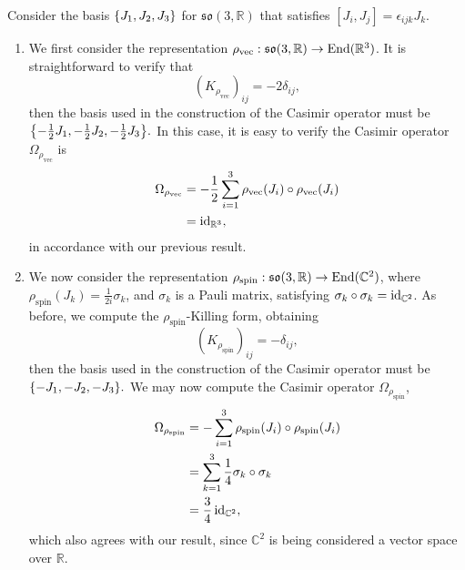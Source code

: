 \begin{example}
    Consider the basis \(\{J_1,J_2,J_3\}\) for \(\mathfrak{so}(3,\mathbb{R})\) that satisfies \([J_i, J_j] = \epsilon_{ijk} J_k.\)
    \begin{enumerate}[label=(\alph*)]
        \item We first consider the representation \(\rho_{\mathrm{vec}} : \mathfrak{so}(3,\mathbb{R}) \to \operatorname{End}(\mathbb{R}^3)\). It is straightforward to verify that
            \begin{equation*}
                \left(K_{\rho_{\mathrm{vec}}}\right)_{ij} = -2\delta_{ij},
            \end{equation*}
            then the basis used in the construction of the Casimir operator must be \(\set*{-\frac{1}{2}J_1, -\frac{1}{2}J_2, -\frac{1}{2}J_3}.\) In this case, it is easy to verify the Casimir operator \(\Omega_{\rho_{\mathrm{vec}}}\) is
            \begin{align*}
                \Omega_{\rho_{\mathrm{vec}}} &= -\frac{1}{2} \sum_{i = 1}^3 \rho_{\mathrm{vec}}(J_i)\circ\rho_{\mathrm{vec}}(J_i)\\
                                             &= \operatorname{id}_{\mathbb{R}^3},
            \end{align*}
            in accordance with our previous result.
        \item We now consider the representation \(\rho_{\mathrm{spin}} : \mathfrak{so}(3,\mathbb{R}) \to \operatorname{End}(\mathbb{C}^2)\), where \(\rho_{\mathrm{spin}}(J_k) = \frac{1}{2i}\sigma_k\), and \(\sigma_k\) is a Pauli matrix, satisfying \(\sigma_k \circ \sigma_k = \operatorname{id}_{\mathbb{C}^2}\). As before, we compute the \(\rho_{\mathrm{spin}}\)-Killing form, obtaining
            \begin{equation*}
                \left(K_{\rho_{\mathrm{spin}}}\right)_{ij} = -\delta_{ij},
            \end{equation*}
            then the basis used in the construction of the Casimir operator must be \(\set*{-J_1, -J_2, -J_3}.\) We may now compute the Casimir operator \(\Omega_{\rho_{\mathrm{spin}}}\),
            \begin{align*}
                \Omega_{\rho_{\mathrm{spin}}} &= -\sum_{i = 1}^3 \rho_{\mathrm{spin}}(J_i)\circ\rho_{\mathrm{spin}}(J_i)\\
                                              &= \sum_{k=1}^3 \frac{1}{4} \sigma_k \circ \sigma_k\\
                                              &= \frac{3}{4} \operatorname{id}_{\mathbb{C}^2},
            \end{align*}
            which also agrees with our result, since \(\mathbb{C}^2\) is being considered a vector space over \(\mathbb{R}\).
    \end{enumerate}
\end{example}

